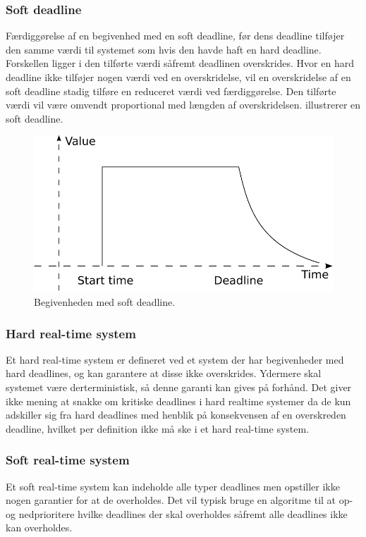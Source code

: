 \subsubsection{Soft deadline}
Færdiggørelse af en begivenhed med en soft deadline, før dens deadline tilføjer den samme værdi til systemet som hvis den havde haft en hard deadline. Forskellen ligger i den tilførte værdi såfremt deadlinen overskrides. Hvor en hard deadline ikke tilføjer nogen værdi ved en overskridelse, vil en overskridelse af en soft deadline stadig tilføre en reduceret værdi ved færdiggørelse. Den tilførte værdi vil være omvendt proportional med længden af overskridelsen.  illustrerer en soft deadline. 

\begin{figure}
 \begin{center}
  \includegraphics[scale=0.75]{images/soft-deadline}
	\caption{Begivenheden med soft deadline.}
	\label{figure:soft-dl}
\end{center}
\end{figure}

\subsubsection{Hard real-time system}
Et hard real-time system er defineret ved et system der har begivenheder med hard deadlines, og kan garantere at disse ikke overskrides. Ydermere skal systemet være derterministisk, så denne garanti kan gives på forhånd. Det giver ikke mening at snakke om kritiske deadlines i hard realtime systemer da de kun adskiller sig fra hard deadlines med henblik på konsekvensen af en overskreden deadline, hvilket per definition ikke må ske i et hard real-time system.  

\subsubsection{Soft real-time system}
Et soft real-time system kan indeholde alle typer deadlines men opstiller ikke nogen garantier for at de overholdes. Det vil typisk bruge en algoritme til at op- og nedprioritere hvilke deadlines der skal overholdes såfremt alle deadlines ikke kan overholdes.

